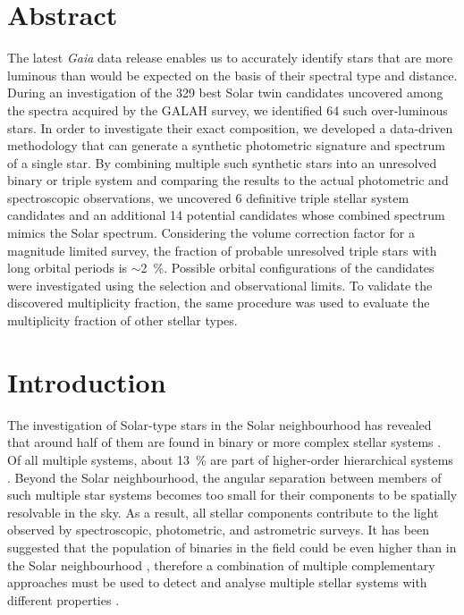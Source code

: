 \section{Abstract}
The latest {\it Gaia} data release enables us to accurately identify stars that are more luminous than would be expected on the basis of their spectral type and distance. During an investigation of the 329 best Solar twin candidates uncovered among the spectra acquired by the GALAH survey, we identified 64 such over-luminous stars. In order to investigate their exact composition, we developed a data-driven methodology that can generate a synthetic photometric signature and spectrum of a single star. By combining multiple such synthetic stars into an unresolved binary or triple system and comparing the results to the actual photometric and spectroscopic observations, we uncovered 6 definitive triple stellar system candidates and an additional 14 potential candidates whose combined spectrum mimics the Solar spectrum. Considering the volume correction factor for a magnitude limited survey, the fraction of probable unresolved triple stars with long orbital periods is $\sim$2~\%. Possible orbital configurations of the candidates were investigated using the selection and observational limits. To validate the discovered multiplicity fraction, the same procedure was used to evaluate the multiplicity fraction of other stellar types. 

\section{Introduction}
The investigation of Solar-type stars in the Solar neighbourhood has revealed that around half of them are found in binary or more complex stellar systems \citep{2010ApJS..190....1R, 2013ARA&A..51..269D, 2017ApJS..230...15M}. Of all multiple systems, about 13~\% are part of higher-order hierarchical systems \citep{2010ApJS..190....1R, 2014AJ....147...87T}. Beyond the Solar neighbourhood, the angular separation between members of such multiple star systems becomes too small for their components to be spatially resolvable in the sky. As a result, all stellar components contribute to the light observed by spectroscopic, photometric, and astrometric surveys. It has been suggested that the population of binaries in the field could be even higher than in the Solar neighbourhood \citep{2000A&A...361..770Q}, therefore a combination of multiple complementary approaches must be used to detect and analyse multiple stellar systems with different properties \citep{2017ApJS..230...15M}.

